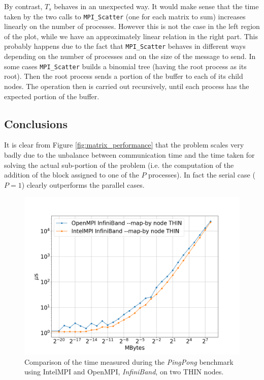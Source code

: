 \documentclass{article}
\begin{document}
By contrast, $T_s$ behaves in an unexpected way. It would make sense that the time taken by the two calls to \texttt{MPI\_Scatter} (one for each matrix to sum) increases linearly on the number of processes. However this is not the case in the left region of the plot, while we have an approximately linear relation in the right part. This probably happens due to the fact that \texttt{MPI\_Scatter} behaves in different ways depending on the number of processes and on the size of the message to send. In some cases \texttt{MPI\_Scatter} builds a binomial tree (having the root process as its root). Then the root process sends a portion of the buffer to each of its child nodes. The operation then is carried out recursively, until each process has the expected portion of the buffer.

\subsection{Conclusions}
It is clear from Figure \ref{fig:matrix_performance} that the problem scales very badly due to the unbalance between communication time and the time taken for solving the actual sub-portion of the problem (i.e. the computation of the addition of the block assigned to one of the $P$ processes). In fact the serial case ($P=1$) clearly outperforms the parallel cases.

\begin{figure}[t!]
    \centering
    \includegraphics[width=\textwidth]{benchmark/intel_vs_ompi_node.png}
    \caption{Comparison of the time measured during the \emph{PingPong} benchmark using IntelMPI and OpenMPI, \emph{InfiniBand}, on two THIN nodes.}
    \label{fig:ompi_vs_intel}
\end{figure}
\end{document}
